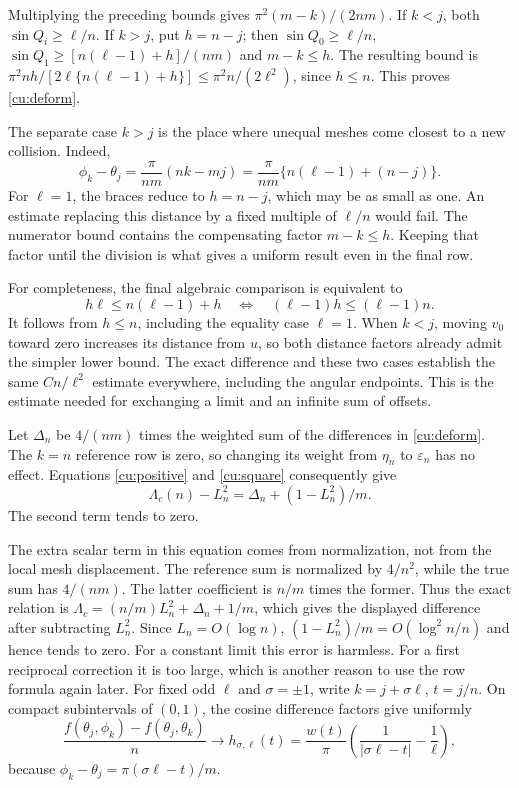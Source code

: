 Multiplying the preceding bounds gives $\pi^2(m-k)/(2nm)$. If $k<j$, both $\sin Q_i\geq\ell/n$.
If $k>j$, put $h=n-j$; then
$\sin Q_0\geq\ell/n$, $\sin Q_1\geq[n(\ell-1)+h]/(nm)$ and
$m-k\leq h$. The resulting bound is
$\pi^2nh/[2\ell\{n(\ell-1)+h\}]\leq\pi^2n/(2\ell^2)$,
since $h\leq n$. This proves \eqref{cu:deform}.

The separate case $k>j$ is the place where unequal meshes come
closest to a new collision. Indeed,
\[
 \phi_k-\theta_j
 =\frac\pi{nm}(nk-mj)
 =\frac\pi{nm}\{n(\ell-1)+(n-j)\}.
\]
For $\ell=1$, the braces reduce to $h=n-j$, which may be as
small as one. An estimate replacing this distance by a fixed
multiple of $\ell/n$ would fail. The numerator bound contains
the compensating factor $m-k\leq h$. Keeping that factor until
the division is what gives a uniform result even in the final row.

For completeness, the final algebraic comparison is equivalent to
\[
 h\ell\leq n(\ell-1)+h
       \quad\Longleftrightarrow\quad
       (\ell-1)h\leq(\ell-1)n.
\]
It follows from $h\leq n$, including the equality case $\ell=1$.
When $k<j$, moving $v_0$ toward zero increases its distance from
$u$, so both distance factors already admit the simpler lower bound.
The exact difference and these two cases establish the same
$C n/\ell^2$ estimate everywhere, including the angular endpoints.
This is the estimate needed for exchanging a limit and an infinite
sum of offsets.

Let $\Delta_n$ be $4/(nm)$ times the weighted sum of the differences in
\eqref{cu:deform}. The $k=n$ reference row is zero, so changing its weight
from $\eta_n$ to $\varepsilon_n$ has no effect. Equations
\eqref{cu:positive} and \eqref{cu:square} consequently give
\[
 \Lambda_c(n)-L_n^2=\Delta_n+(1-L_n^2)/m.
\]
The second term tends to zero.

The extra scalar term in this equation comes from normalization,
not from the local mesh displacement. The reference sum is normalized
by $4/n^2$, while the true sum has $4/(nm)$. The latter coefficient
is $n/m$ times the former. Thus the exact relation is
$\Lambda_c=(n/m)L_n^2+\Delta_n+1/m$, which gives the displayed
difference after subtracting $L_n^2$. Since $L_n=O(\log n)$,
$(1-L_n^2)/m=O(\log^2 n/n)$ and hence tends to zero.
For a constant limit this error is harmless. For a first reciprocal
correction it is too large, which is another reason to use the row
formula again later. For fixed odd $\ell$ and $\sigma=\pm1$,
write $k=j+\sigma\ell$, $t=j/n$. On compact subintervals of $(0,1)$,
the cosine difference factors give uniformly
\[
 \frac{f(\theta_j,\phi_k)-f(\theta_j,\theta_k)}n
 \longrightarrow h_{\sigma,\ell}(t)
 =\frac{w(t)}\pi\left(\frac1{|\sigma\ell-t|}-\frac1\ell\right),
\]
because $\phi_k-\theta_j=\pi(\sigma\ell-t)/m$.

